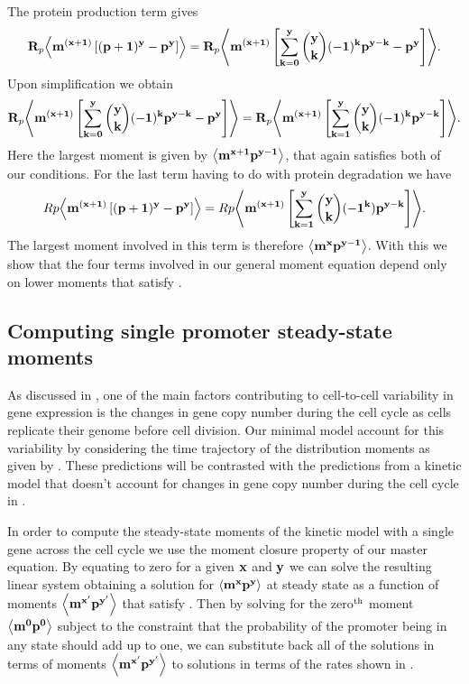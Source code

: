 The protein production term gives
\begin{equation}
  \mathbf{R}_p \mathbf{\left\langle m^{(x + 1)} \left[ (p + 1)^y - p^y \right] \right\rangle} =
  \mathbf{R}_p \mathbf{\left\langle m^{(x + 1)} \left[ \sum_{k=0}^y {y \choose k} (-1)^k p^{y-k}
                                - p^y \right] \right\rangle}.
\end{equation}
Upon simplification we obtain
\begin{equation}
  \mathbf{R}_p \mathbf{\left\langle m^{(x + 1)} \left[ \sum_{k=0}^y {y \choose k} (-1)^k p^{y-k}
                                - p^y \right] \right\rangle} =
  \mathbf{R}_p \mathbf{\left\langle m^{(x + 1)} \left[ \sum_{k=1}^y {y \choose k}(-1)^k p^{y-k}
  \right] \right\rangle}.
\end{equation}
Here the largest moment is given by $\mathbf{\left\langle m^{x+1} p^{y-1} \right\rangle}$, that again
satisfies both of our conditions. For the last term having to do with protein
degradation we have
\begin{equation}
  Rp \mathbf{\left\langle m^{(x + 1)} \left[ (p + 1)^y - p^y \right] \right\rangle} =
  Rp \mathbf{\left\langle m^{(x + 1)} \left[ \sum_{k=1}^y {y \choose k} (-1^k) p^{y - k}
  \right] \right\rangle}.
\end{equation}
The largest moment involved in this term is therefore $\mathbf{\left\langle m^x p^{y-1} \right\rangle}$.
With this we show that the four terms involved in our general moment equation
depend only on lower moments that satisfy .

\subsection{Computing single promoter steady-state moments}

As discussed in , one of the main factors contributing to
cell-to-cell variability in gene expression is the  changes in gene copy number
during the cell cycle as cells replicate their  genome before cell division. Our
minimal model account for this variability by considering the time trajectory of
the distribution moments as given by . These
predictions will be contrasted with the predictions from a kinetic model that
doesn't account for changes in gene copy number during the cell cycle in
.

In order to compute the steady-state moments of the kinetic model with a single
gene across the cell cycle we use the moment closure property of our master
equation. By equating  to zero for a given
$\mathbf{x}$ and $\mathbf{y}$ we can solve the resulting linear system obtaining a
solution for $\mathbf{\left\langle m^x p^y \right\rangle}$ at steady state as a function of moments
$\mathbf{\left\langle m^{x'} p^{y'} \right\rangle}$ that satisfy . Then by
solving for the zero$^\text{th}$ moment $\mathbf{\left\langle m^0 p^0 \right\rangle}$ subject to the constraint
that the probability of the promoter being in any state should add up to one,
we can substitute back all of the solutions in terms of moments $\mathbf{\left\langle m^{x'}
p^{y'} \right\rangle}$ to solutions in terms of the rates shown in .
